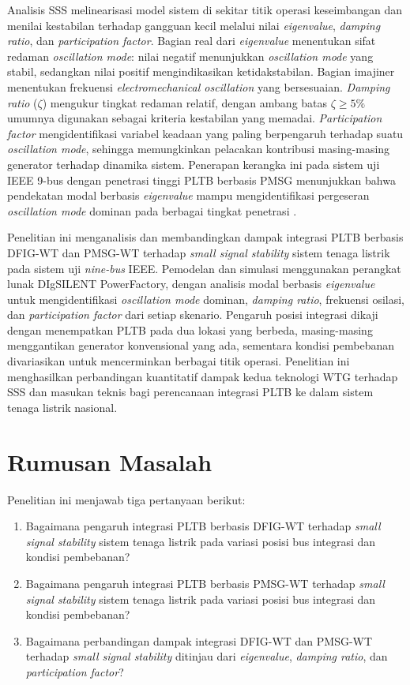 Analisis SSS melinearisasi model sistem di sekitar titik operasi keseimbangan
dan menilai kestabilan terhadap gangguan kecil melalui nilai \textit{eigenvalue},
\textit{damping ratio}, dan \textit{participation factor}. Bagian real dari
\textit{eigenvalue} menentukan sifat redaman \textit{oscillation mode}: nilai
negatif menunjukkan \textit{oscillation mode} yang stabil, sedangkan nilai
positif mengindikasikan ketidakstabilan. Bagian
imajiner menentukan frekuensi \textit{electromechanical oscillation} yang bersesuaian.
\textit{Damping ratio} ($\zeta$) mengukur tingkat redaman relatif, dengan ambang batas
$\zeta \geq 5\%$ umumnya digunakan sebagai kriteria kestabilan yang memadai.
\textit{Participation factor} mengidentifikasi variabel keadaan yang paling
berpengaruh terhadap suatu \textit{oscillation mode}, sehingga memungkinkan pelacakan
kontribusi masing-masing generator terhadap dinamika sistem. Penerapan kerangka
ini pada sistem uji IEEE 9-bus dengan penetrasi tinggi PLTB berbasis PMSG
menunjukkan bahwa pendekatan modal berbasis \textit{eigenvalue} mampu
mengidentifikasi pergeseran \textit{oscillation mode} dominan pada berbagai tingkat penetrasi
\cite{wang2014small}.

Penelitian ini menganalisis dan membandingkan dampak integrasi PLTB berbasis
DFIG-WT dan PMSG-WT terhadap \textit{small signal stability} sistem tenaga
listrik pada sistem uji \textit{nine-bus} IEEE. Pemodelan dan simulasi
menggunakan perangkat lunak DIgSILENT PowerFactory, dengan analisis modal
berbasis \textit{eigenvalue} untuk mengidentifikasi \textit{oscillation mode} dominan,
\textit{damping ratio}, frekuensi osilasi, dan \textit{participation factor}
dari setiap skenario. Pengaruh posisi integrasi dikaji dengan menempatkan PLTB
pada dua lokasi yang berbeda, masing-masing menggantikan generator konvensional
yang ada, sementara kondisi pembebanan divariasikan untuk mencerminkan berbagai titik operasi.
Penelitian ini menghasilkan perbandingan kuantitatif dampak kedua teknologi WTG
terhadap SSS dan masukan teknis bagi perencanaan integrasi PLTB ke dalam sistem
tenaga listrik nasional.

\section{Rumusan Masalah}

Penelitian ini menjawab tiga pertanyaan berikut:

\begin{enumerate}
	\item Bagaimana pengaruh integrasi PLTB berbasis DFIG-WT terhadap
	\textit{small signal stability} sistem tenaga listrik pada variasi posisi bus
	integrasi dan kondisi pembebanan?
	\item Bagaimana pengaruh integrasi PLTB berbasis PMSG-WT terhadap
	\textit{small signal stability} sistem tenaga listrik pada variasi posisi bus
	integrasi dan kondisi pembebanan?
	\item Bagaimana perbandingan dampak integrasi DFIG-WT dan PMSG-WT terhadap
	\textit{small signal stability} ditinjau dari \textit{eigenvalue},
	\textit{damping ratio}, dan \textit{participation factor}?
\end{enumerate}

